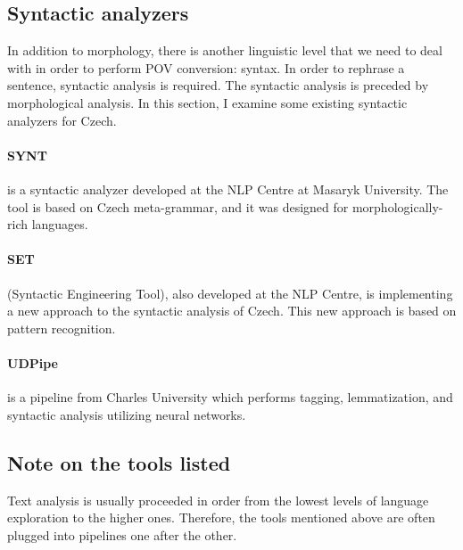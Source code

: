 \subsection{Syntactic analyzers}
\label{sec:synt-an}

In addition to morphology, there is another linguistic level that we need to deal with in order to perform POV conversion: syntax. In order to rephrase a sentence, syntactic analysis is required. The syntactic analysis is preceded by morphological analysis. In this section, I examine some existing syntactic analyzers for Czech.

\paragraph{SYNT} is a syntactic analyzer developed at the NLP Centre at Masaryk University. The tool is based on Czech meta-grammar, and it was designed for morphologically-rich languages.

\paragraph{SET} (Syntactic Engineering Tool), also developed at the NLP Centre, is implementing a new approach to the syntactic analysis of Czech. This new approach is based on pattern recognition. \cite{set}

\paragraph{UDPipe} is a pipeline from Charles University which performs tagging, lemmatization, and syntactic analysis utilizing neural networks. \cite{straka-2018-udpipe}

\subsection*{Note on the tools listed}

Text analysis is usually proceeded in order from the lowest levels of language exploration to the higher ones. Therefore, the tools mentioned above are often plugged into pipelines one after the other.

